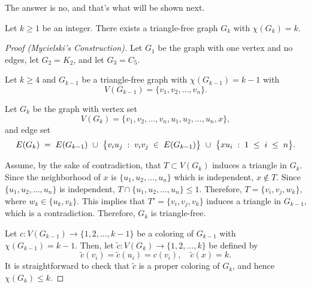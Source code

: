 The answer is no, and that's what will be shown next.

\begin{theorem}
    Let \(k \geq 1\) be an integer.
    There exists a triangle-free graph \(G_k\) with \(\chi(G_k) = k\).
\end{theorem}

\begin{proof}[Proof (Mycielski's Construction)]
    Let \(G_1\) be the graph with one vertex and no edges,
    let \(G_2 = K_2\), and let \(G_{3} = C_5\).

    Let \(k \geq 4\) and \(G_{k-1}\) be a triangle-free graph with \(\chi(G_{k-1}) = k-1\) with
    \begin{equation}
        V(G_{k-1}) = \{v_1, v_2, \ldots, v_n\}.
    \end{equation}

    Let \(G_k\) be the graph with vertex set
    \begin{equation}
        V(G_k) = \{v_1, v_2, \ldots, v_n, u_1, u_2, \ldots, u_n, x\},
    \end{equation}
    and edge set
    \begin{equation}
        \thickmuskip=10mu
        \medmuskip=10mu
        E(G_k)
        = E(G_{k-1})
        \cup \big\{v_iu_j : v_iv_j \in E(G_{k-1})\big\}
        \cup \big\{xu_i : 1 \leq i \leq n\big\}.
    \end{equation}

    Assume, by the sake of contradiction, that \(T \subset V(G_k)\) induces a triangle in \(G_k\).
    Since the neighborhood of \(x\) is \(\{u_1, u_2, \ldots, u_n\}\) which is independent, \(x \notin T\).
    Since \(\{u_1, u_2, \ldots, u_n\}\) is independent, \(T \cap \{u_1, u_2, \ldots, u_n\} \leq 1\).
    Therefore, \(T = \{v_i, v_j, w_k\}\), where \(w_k \in \{u_k, v_k\}\).
    This implies that \(T' = \{v_i, v_j, v_k\}\) induces a triangle in \(G_{k-1}\), which is a contradiction.
    Therefore, \(G_k\) is triangle-free.

    Let \(c \colon V(G_{k-1}) \to \{1, 2, \ldots, k-1\}\) be a coloring of \(G_{k-1}\) with \(\chi(G_{k-1}) = k-1\).
    Then, let \(\tilde{c} \colon V(G_k) \to \{1, 2, \ldots, k\}\)
    be defined by
    \begin{equation}
        \tilde{c}(v_i) = \tilde{c}(u_i) = c(v_i),
        \quad
        \tilde{c}(x) = k.
    \end{equation}
    It is straightforward to check that \(\tilde{c}\) is a proper coloring of \(G_k\), and hence \(\chi(G_k) \leq k\).


\end{proof}
